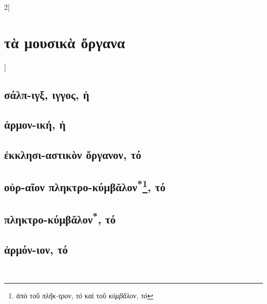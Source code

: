 \documentclass{book}
\begin{document}
\begin{multicols}{2}[\section{τὰ μουσικὰ ὄργανα}]
\subsection{σάλπ-ιγξ, ιγγος, ἡ}
\subsection{ἁρμον-ική, ἡ}
\subsection{ἐκκλησι-αστικὸν ὄργανον, τό}
\subsection{οὐρ-αῖον πληκτρο-κύμβᾰλον\textsuperscript{*}\protect\footnote{ἀπὸ τοῦ \emph{πλῆκ-τρον, τό} καὶ τοῦ \emph{κύμβᾰλον, τό}}, τό}
\subsection{πληκτρο-κύμβᾰλον\textsuperscript{*\number\value{footnote}}, τό}
\subsection{ἁρμόν-ιον, τό}
~
\end{multicols}
\newpage 
\end{document}
